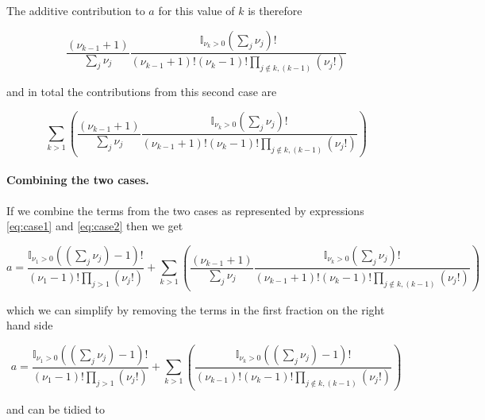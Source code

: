 \documentclass{article}
\begin{document}
The additive contribution to $a$ for this value of $k$ is therefore

\begin{equation}
\frac{\left(\nu_{k-1}+1 \right)}{ \sum_j  \nu_j }
\frac{\mathbb{I}_{\nu_k > 0} \left( \sum_j  \nu_j \right)!}
{\left(\nu_{k-1} + 1 \right)! \left(\nu_k - 1 \right)!
\prod_{j \notin k,(k-1)} \left( \nu_j! \right)}
\end{equation}

and in total the contributions from this second case are

\begin{equation} \label{eq:case2}
\sum_{k>1}\left(
\frac{\left(\nu_{k-1}+1 \right)}
{ \sum_j  \nu_j }
\frac{\mathbb{I}_{\nu_k > 0} \left( \sum_j  \nu_j \right)!}
{\left(\nu_{k-1} + 1 \right)! \left(\nu_k - 1 \right)!
\prod_{j \notin k,(k-1)} \left( \nu_j! \right)}
\right)
\end{equation}


\paragraph{Combining the two cases.}

If we combine the terms from the two cases as represented by expressions \ref{eq:case1} and \ref{eq:case2} then we get

\begin{equation} 
a = \frac{\mathbb{I}_{\nu_1>0} \left(\left( \sum_j  \nu_j \right)-1\right)! }
{\left(\nu_1 - 1 \right)!\prod_{j>1} \left( \nu_j! \right)}
+ \sum_{k>1}\left(
\frac{\left(\nu_{k-1}+1 \right)}
{ \sum_j  \nu_j }
\frac{\mathbb{I}_{\nu_k > 0} \left( \sum_j  \nu_j \right)!}
{\left(\nu_{k-1} + 1 \right)! \left(\nu_k - 1 \right)!
\prod_{j \notin k,(k-1)} \left( \nu_j! \right)}
\right)
\end{equation}

\noindent which we can simplify by removing the terms in the first fraction on the right hand side 

\begin{equation} 
a = \frac{\mathbb{I}_{\nu_1>0} \left(\left( \sum_j  \nu_j \right)-1\right)! }
{\left(\nu_1 - 1 \right)!\prod_{j>1} \left( \nu_j! \right)}
+ \sum_{k>1}\left(
\frac{\mathbb{I}_{\nu_k > 0} \left(\left( \sum_j  \nu_j \right)-1\right)!}
{\left(\nu_{k-1} \right)! \left(\nu_k - 1 \right)!
\prod_{j \notin k,(k-1)} \left( \nu_j! \right)}
\right)
\end{equation}

\noindent and can be tidied to
\end{document}
